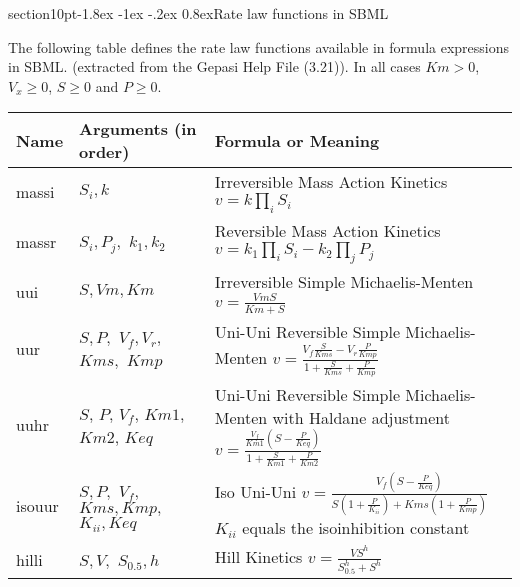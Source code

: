 \documentclass[10pt]{article}
\makeatletter
\renewcommand{\section}{\@startsection%
  {section}{1}{0pt}{-1.8ex \@plus -1ex \@minus -.2ex}%
  {0.8ex}{\normalfont\Large\bfseries}}
\newcommand{\D}{\displaystyle}
\makeatother
\begin{document}
\section{Rate law functions in SBML}
\label{appendix:ratelaws}

The following table defines the rate law functions available in
formula expressions in SBML. (extracted from the Gepasi Help File
(3.21)). In all cases $Km > 0$, $V_x \geq 0$, $S \geq 0$ and $P
\geq 0$.

\begin{table}[h]
\begin{tabular}{|p{1cm}|p{2cm}|p{13cm}|}
\hline
Name & Arguments (in order) & Formula or Meaning \\ \hline

massi & $S_i, k$ & Irreversible Mass Action Kinetics $ v = k
\prod_i S_i $  \\ \hline

massr & $S_i, P_j, $ $  k_1, k_2$ & Reversible Mass Action
Kinetics $ v = k_1 \prod_i S_i - k_2 \prod_j P_j $ \\ \hline

uui & $ S, Vm, Km $ & Irreversible Simple Michaelis-Menten $ v =
\frac{Vm S}{Km + S} $ \\ \hline

uur & $ S, P, $ $ V_f, V_r, $ $ Kms,$ $ Kmp $ & Uni-Uni
Reversible Simple Michaelis-Menten $ v = \frac{V_f \frac{\D S}{\D
Kms} - V_r \frac{\D P}{\D Kmp}}{1 + \frac{\D S}{\D Kms} +
\frac{\D P}{\D Kmp} } $  \\ \hline

uuhr & $S$, $P$, $V_f$, $Km1$, $Km2$, $Keq$ & Uni-Uni
Reversible Simple Michaelis-Menten with Haldane adjustment $ v =
\frac{\frac{V_f}{Km1} \left(S -
\frac{P}{Keq} \right)}{1 + \frac{S}{Km1} + \frac{P}{Km2}} $  \\
\hline

isouur & $ S, P, $ $  V_f, $ $ Kms, Kmp, $ $ K_{ii}, Keq $ & Iso
Uni-Uni $ v = \frac{V_f \left(S - \frac{P}{Keq}\right)}{S \left(1
+ \frac{P}{K_{ii}}\right) + Kms \left(1 + \frac{P}{Kmp}\right)} $
$K_{ii}$ equals the isoinhibition constant  \\ \hline

hilli & $ S, V, $ $ S_{0.5}, h $ & Hill Kinetics $ v = \frac{V
S^h}{S_{0.5}^h + S^h} $ \\ \hline


\end{tabular}
\end{table}
\end{document}
